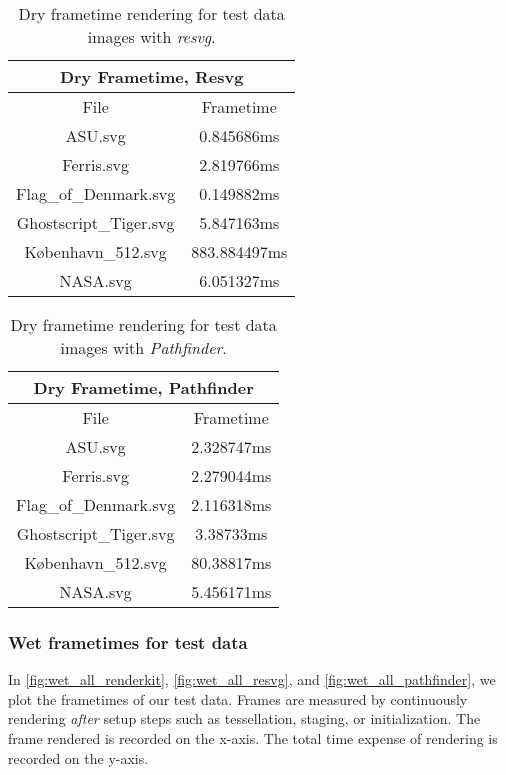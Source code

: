 \begin{table}[H]
\centering
\begin{tabular}{ |c|c| }
\hline
\multicolumn{2}{|c|}{Dry Frametime, Resvg}\\
\hline
File&Frametime\\
\hline
ASU.svg&0.845686ms\\
\hline
Ferris.svg&2.819766ms\\
\hline
Flag\_of\_Denmark.svg&0.149882ms\\
\hline
Ghostscript\_Tiger.svg&5.847163ms\\
\hline
København\_512.svg&883.884497ms\\
\hline
NASA.svg&6.051327ms\\
\hline
\end{tabular}
\caption{Dry frametime rendering for test data images with \textit{resvg}.\label{tab:first_frame_resvg}}
\end{table}
\medskip

\begin{table}[H]
\centering
\begin{tabular}{ |c|c| }
\hline
\multicolumn{2}{|c|}{Dry Frametime, Pathfinder}\\
\hline
File&Frametime\\
\hline
ASU.svg&2.328747ms\\
\hline
Ferris.svg&2.279044ms\\
\hline
Flag\_of\_Denmark.svg&2.116318ms\\
\hline
Ghostscript\_Tiger.svg&3.38733ms\\
\hline
København\_512.svg&80.38817ms\\
\hline
NASA.svg&5.456171ms\\
\hline
\end{tabular}
\caption{Dry frametime rendering for test data images with \textit{Pathfinder}.\label{tab:first_frame_pathfinder}}
\end{table}

\subsubsection{Wet frametimes for test data}\label{sec:wet_frametimes}
In \cref{fig:wet_all_renderkit}, \cref{fig:wet_all_resvg}, and \cref{fig:wet_all_pathfinder}, we plot the frametimes of our test data. Frames are measured by continuously rendering \emph{after} setup steps such as tessellation, staging, or initialization. The frame rendered is recorded on the x-axis. The total time expense of rendering is recorded on the y-axis.\medskip

